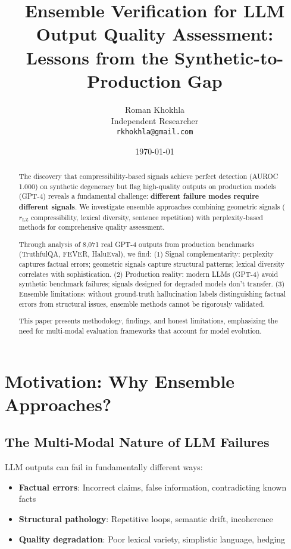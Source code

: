 \documentclass[11pt]{article}
\title{Ensemble Verification for LLM Output Quality Assessment:\\
\textbf{Lessons from the Synthetic-to-Production Gap}}
\author{
  Roman Khokhla\\
  Independent Researcher\\
  \texttt{rkhokhla@gmail.com}
}
\date{\today}
\begin{document}
\maketitle

\begin{abstract}
The discovery that compressibility-based signals achieve perfect detection (AUROC 1.000) on synthetic degeneracy but flag high-quality outputs on production models (GPT-4) reveals a fundamental challenge: \textbf{different failure modes require different signals}. We investigate ensemble approaches combining geometric signals ($r_{\text{LZ}}$ compressibility, lexical diversity, sentence repetition) with perplexity-based methods for comprehensive quality assessment.

Through analysis of 8,071 real GPT-4 outputs from production benchmarks (TruthfulQA, FEVER, HaluEval), we find: (1) Signal complementarity: perplexity captures factual errors; geometric signals capture structural patterns; lexical diversity correlates with sophistication. (2) Production reality: modern LLMs (GPT-4) avoid synthetic benchmark failures; signals designed for degraded models don't transfer. (3) Ensemble limitations: without ground-truth hallucination labels distinguishing factual errors from structural issues, ensemble methods cannot be rigorously validated.

This paper presents methodology, findings, and honest limitations, emphasizing the need for multi-modal evaluation frameworks that account for model evolution.
\end{abstract}

\section{Motivation: Why Ensemble Approaches?}
\label{sec:motivation}

\subsection{The Multi-Modal Nature of LLM Failures}

LLM outputs can fail in fundamentally different ways:
\begin{itemize}
\item \textbf{Factual errors}: Incorrect claims, false information, contradicting known facts
\item \textbf{Structural pathology}: Repetitive loops, semantic drift, incoherence
\item \textbf{Quality degradation}: Poor lexical variety, simplistic language, hedging
\end{itemize}
\end{document}
